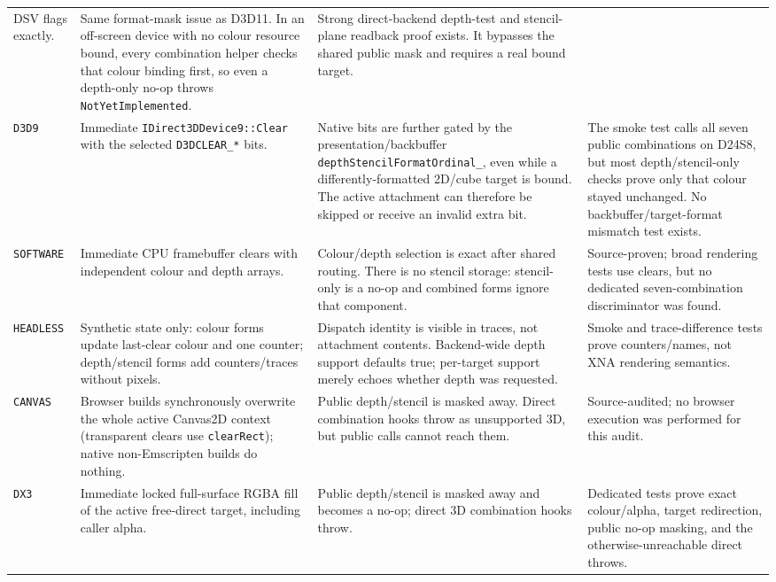 \begin{longtable}{@{}p{}p{}p{}p{}@{}}
    DSV flags exactly.
  & Same format-mask issue as D3D11. In an off-screen device with no colour resource bound,
    every combination helper checks that colour binding first, so even a depth-only no-op
    throws \texttt{NotYetImplemented}.
  & Strong direct-backend depth-test and stencil-plane readback proof exists. It bypasses the
    shared public mask and requires a real bound target. \\
\texttt{D3D9}
  & Immediate \texttt{IDirect3DDevice9::Clear} with the selected
    \texttt{D3DCLEAR\_*} bits.
  & Native bits are further gated by the presentation/backbuffer
    \texttt{depthStencilFormatOrdinal\_}, even while a differently-formatted 2D/cube target is
    bound. The active attachment can therefore be skipped or receive an invalid extra bit.
  & The smoke test calls all seven public combinations on D24S8, but most depth/stencil-only
    checks prove only that colour stayed unchanged. No backbuffer/target-format mismatch test
    exists. \\
\texttt{SOFTWARE}
  & Immediate CPU framebuffer clears with independent colour and depth arrays.
  & Colour/depth selection is exact after shared routing. There is no stencil storage:
    stencil-only is a no-op and combined forms ignore that component.
  & Source-proven; broad rendering tests use clears, but no dedicated seven-combination
    discriminator was found. \\
\texttt{HEADLESS}
  & Synthetic state only: colour forms update last-clear colour and one counter; depth/stencil
    forms add counters/traces without pixels.
  & Dispatch identity is visible in traces, not attachment contents. Backend-wide depth support
    defaults true; per-target support merely echoes whether depth was requested.
  & Smoke and trace-difference tests prove counters/names, not XNA rendering semantics. \\
\texttt{CANVAS}
  & Browser builds synchronously overwrite the whole active Canvas2D context (transparent
    clears use \texttt{clearRect}); native non-Emscripten builds do nothing.
  & Public depth/stencil is masked away. Direct combination hooks throw as unsupported 3D, but
    public calls cannot reach them.
  & Source-audited; no browser execution was performed for this audit. \\
\texttt{DX3}
  & Immediate locked full-surface RGBA fill of the active free-direct target, including caller
    alpha.
  & Public depth/stencil is masked away and becomes a no-op; direct 3D combination hooks throw.
  & Dedicated tests prove exact colour/alpha, target redirection, public no-op masking, and the
    otherwise-unreachable direct throws. \\
\bottomrule
\end{longtable}
\endgroup

